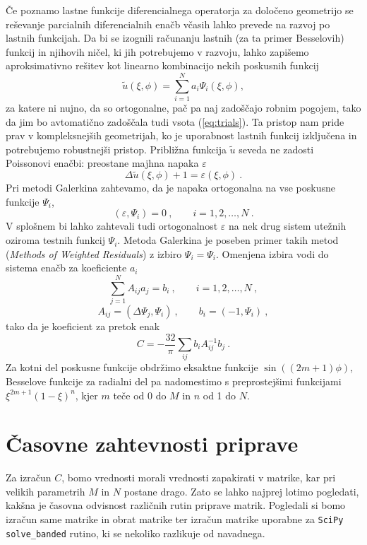 \documentclass[notoc]{porocilo}
\begin{document}
Če poznamo lastne funkcije diferencialnega operatorja za določeno
geometrijo se reševanje parcialnih diferencialnih enačb včasih lahko prevede na razvoj po lastnih funkcijah. Da bi se izognili
računanju lastnih (za ta primer Besselovih) funkcij in njihovih ničel,
ki jih potrebujemo v razvoju, lahko zapišemo aproksimativno
rešitev kot linearno kombinacijo nekih poskusnih funkcij
\begin{equation}
    \tilde{u}(\xi,\phi) = \sum\limits_{i=1}^N  a_i \Psi_i(\xi,\phi),
    \label{eq:trials}
\end{equation}
za katere ni nujno, da so ortogonalne, pač pa naj zadoščajo
robnim pogojem, tako da jim bo avtomatično zadoščala tudi
vsota (\ref{eq:trials}). Ta pristop nam pride prav v kompleksnejših geometrijah,
ko je uporabnost lastnih funkcij izključena in potrebujemo robustnejši pristop.
Približna funkcija $\tilde{u}$ seveda ne zadosti Poissonovi enačbi: preostane majhna napaka $\varepsilon$
\begin{equation*}
    \Delta \tilde{u}(\xi,\phi) + 1 = \varepsilon(\xi,\phi) \>.
\end{equation*}
Pri metodi Galerkina zahtevamo, da je napaka ortogonalna
na vse poskusne funkcije $\Psi_i$,
\begin{equation*}
    (\varepsilon,\Psi_i) = 0 \>, \qquad  i = 1,2,\dots, N \>.
\end{equation*}
V splošnem bi lahko zahtevali tudi ortogonalnost $\varepsilon$
na nek drug sistem utežnih oziroma testnih funkcij $\Psi_i$.  Metoda Galerkina je poseben
primer takih metod ({\sl Methods of Weighted Residuals\/})
z izbiro $\Psi_i = \Psi_i$.  Omenjena izbira vodi do sistema
enačb za koeficiente $a_i$
\begin{equation}
    \sum_{j=1}^N A_{ij} a_j = b_i\>, \qquad  i = 1,2,\dots, N \>,
    \label{eq:sistem}
\end{equation}
\[
    A_{ij} = (\Delta \Psi_j,\Psi_i) \>, \qquad b_i = (-1,\Psi_i) \>,
\]
tako da je koeficient za pretok enak
\begin{equation*}
    C =-\frac{32}{ \pi} \sum_{ij}  b_i A_{ij}^{-1} b_j \>.
\end{equation*}
Za kotni del poskusne funkcije obdržimo eksaktne funkcije
$\sin((2m+1)\phi)$, Besselove funkcije za radialni del
pa nadomestimo s preprostejšimi funkcijami $\xi^{2m+1}{(1-\xi)}^n$, kjer $m$ teče od 0 do $M$ in $n$ od 1 do $N$.

\section{Časovne zahtevnosti priprave}
Za izračun $C$, bomo vrednosti morali vrednosti zapakirati v matrike, kar pri velikih parametrih $M$ in $N$ postane drago. Zato se lahko najprej lotimo pogledati, kakšna je časovna odvisnost različnih rutin priprave matrik. Pogledali si bomo izračun same matrike in obrat matrike ter izračun matrike uporabne za \texttt{SciPy solve\_banded} rutino, ki se nekoliko razlikuje od navadnega.
\end{document}

